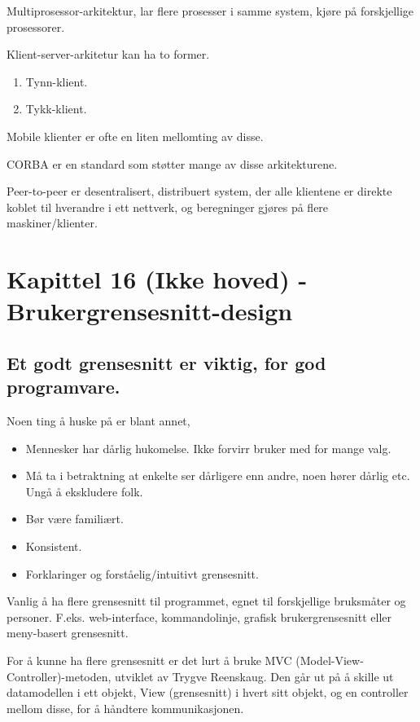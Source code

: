 \documentclass[11pt]{article}
\begin{document}
  Multiprosessor-arkitektur, lar flere prosesser i samme system, kjøre på forskjellige prosessorer.

  Klient-server-arkitetur kan ha to former.

\begin{enumerate}
\item Tynn-klient.
\item Tykk-klient.
\end{enumerate}

  Mobile klienter er ofte en liten mellomting av disse.

  CORBA er en standard som støtter mange av disse arkitekturene.

  Peer-to-peer er desentralisert, distribuert system, der alle klientene er direkte
  koblet til hverandre i ett nettverk, og beregninger gjøres på flere maskiner/klienter.
\section{Kapittel 16 (Ikke hoved) - Brukergrensesnitt-design}
\label{sec-14}
\subsection{Et godt grensesnitt er viktig, for god programvare.}
\label{sec-14.1}

   Noen ting å huske på er blant annet,

\begin{itemize}
\item Mennesker har dårlig hukomelse. Ikke forvirr bruker med for mange valg.
\item Må ta i betraktning at enkelte ser dårligere enn andre, noen hører dårlig etc. Ungå å ekskludere folk.
\item Bør være familiært.
\item Konsistent.
\item Forklaringer og forståelig/intuitivt grensesnitt.
\end{itemize}

  Vanlig å ha flere grensesnitt til programmet, 
  egnet til forskjellige bruksmåter og personer. F.eks. web-interface, 
  kommandolinje, grafisk brukergrensesnitt eller meny-basert grensesnitt.

  For å kunne ha flere grensesnitt er det lurt å bruke MVC (Model-View-Controller)-metoden, utviklet av Trygve Reenskaug. 
  Den går ut på å skille ut datamodellen i ett objekt, View (grensesnitt) i hvert sitt objekt, 
  og en controller mellom disse, for å håndtere kommunikasjonen.
\end{document}
